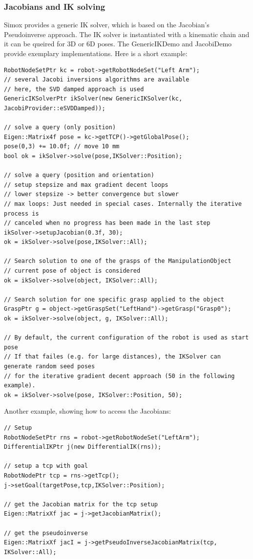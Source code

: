 \subsubsection{Jacobians and IK solving}
Simox provides a generic IK solver, which is based on the Jacobian's Pseudoinverse approach. The IK solver is instantiated with a kinematic chain and it can be queired for 3D or 6D poses. The GenericIKDemo and JacobiDemo provide exemplary implementations. Here is a short example:
\begin{lstlisting}
RobotNodeSetPtr kc = robot->getRobotNodeSet("Left Arm");
// several Jacobi inversions algorithms are available
// here, the SVD damped approach is used
GenericIKSolverPtr ikSolver(new GenericIKSolver(kc, JacobiProvider::eSVDDamped));

// solve a query (only position)
Eigen::Matrix4f pose = kc->getTCP()->getGlobalPose();
pose(0,3) += 10.0f; // move 10 mm
bool ok = ikSolver->solve(pose,IKSolver::Position);

// solve a query (position and orientation)
// setup stepsize and max gradient decent loops
// lower stepsize -> better convergence but slower
// max loops: Just needed in special cases. Internally the iterative process is
// canceled when no progress has been made in the last step
ikSolver->setupJacobian(0.3f, 30); 
ok = ikSolver->solve(pose,IKSolver::All);

// Search solution to one of the grasps of the ManipulationObject
// current pose of object is considered
ok = ikSolver->solve(object, IKSolver::All);

// Search solution for one specific grasp applied to the object
GraspPtr g = object->getGraspSet("LeftHand")->getGrasp("Grasp0");
ok = ikSolver->solve(object, g, IKSolver::All);

// By default, the current configuration of the robot is used as start pose
// If that failes (e.g. for large distances), the IKSolver can generate random seed poses
// for the iterative gradient decent approach (50 in the following example).
ok = ikSolver->solve(pose, IKSolver::Position, 50);
\end{lstlisting}
Another example, showing how to access the Jacobians:
\begin{lstlisting}
// Setup
RobotNodeSetPtr rns = robot->getRobotNodeSet("LeftArm");
DifferentialIKPtr j(new DifferentialIK(rns));

// setup a tcp with goal
RobotNodePtr tcp = rns->getTcp();
j->setGoal(targetPose,tcp,IKSolver::Position);

// get the Jacobian matrix for the tcp setup
Eigen::MatrixXf jac = j->getJacobianMatrix();

// get the pseudoinverse
Eigen::MatrixXf jacI = j->getPseudoInverseJacobianMatrix(tcp, IKSolver::All);
\end{lstlisting}
